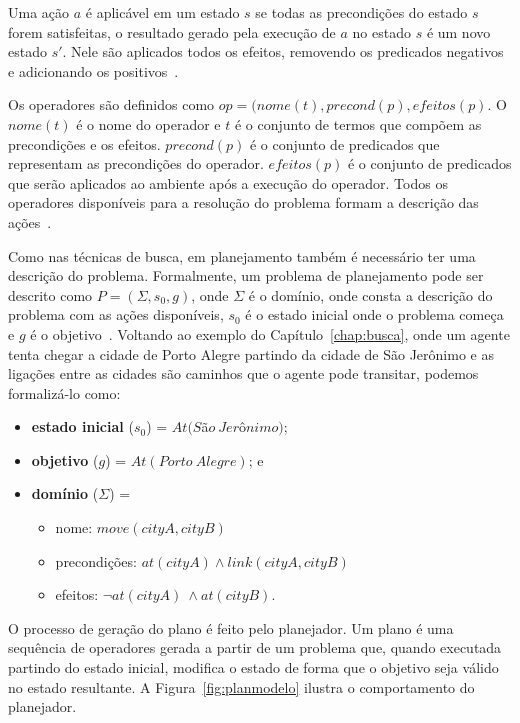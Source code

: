 Uma ação $a$ é aplicável em um estado $s$ se todas as precondições do estado $s$ forem satisfeitas, o resultado gerado pela execução de $a$ no estado $s$ é um novo estado $s'$.
Nele são aplicados todos os efeitos, removendo os predicados negativos e adicionando os positivos~\cite{meneguzzi2015planning}.

Os operadores são definidos como $op = (nome(t), precond(p), efeitos(p)$. 
O $nome(t)$ é o nome do operador e $t$ é o conjunto de termos que compõem as precondições e os efeitos. $precond(p)$ é o conjunto de predicados que representam as precondições do operador. $efeitos(p)$ é o conjunto de predicados que serão aplicados ao ambiente após a execução do operador.
Todos os operadores disponíveis para a resolução do problema formam a descrição das ações~\cite{ghallab2004automated}.
 
Como nas técnicas de busca, em planejamento também é necessário ter uma descrição do problema.
Formalmente, um problema de planejamento pode ser descrito como $P = (\Sigma, s_{0}, g)$, onde $\Sigma$ é o domínio, onde consta a descrição do problema com as ações disponíveis, $s_{0}$ é o estado inicial onde o problema começa e $g$ é o objetivo~\cite{ghallab2004automated}. 
Voltando ao exemplo do Capítulo~\ref{chap:busca}, onde um agente tenta chegar a cidade de Porto Alegre partindo da cidade de São Jerônimo e as ligações entre as cidades são caminhos que o agente pode transitar, podemos formalizá-lo como:

\begin{itemize}
	\item \textbf{estado inicial} ($s_{0}$) = $At(S$\~a$o~Jer$\^o$nimo)$;
	\item \textbf{objetivo} ($g$) = $At(Porto~Alegre)$; e
	\item \textbf{domínio} ($\Sigma$) = 
	\begin{itemize}
		\item nome: $move(cityA, cityB)$
		\item precondições: $at(cityA) \wedge link(cityA, cityB)$
		\item efeitos: $\neg at(cityA)~ \wedge at(cityB)$.
	\end{itemize}
\end{itemize}

O processo de geração do plano é feito pelo planejador. 
Um plano é uma sequência de operadores gerada a partir de um problema que, quando executada partindo do estado inicial, modifica o estado de forma que o objetivo seja válido no estado resultante. 
A Figura~\ref{fig:planmodelo} ilustra o comportamento do planejador.

